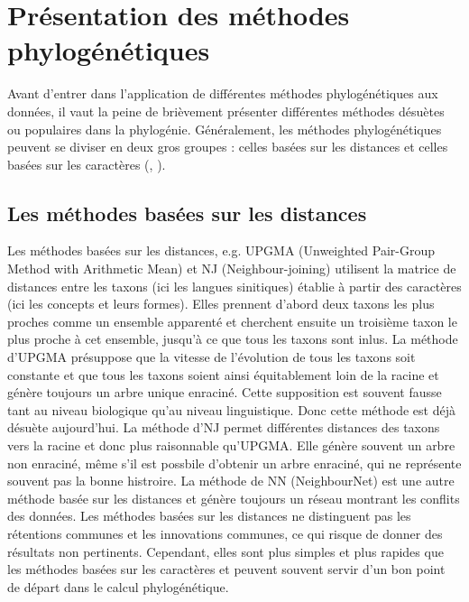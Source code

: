 \documentclass{scrbook}
\newcounter{c}[subsubsection]
\begin{document}
\begin{sloppypar}
\section{Présentation des méthodes phylogénétiques}
Avant d'entrer dans l'application de différentes méthodes phylogénétiques aux données, il vaut la peine de brièvement présenter différentes méthodes désuètes ou populaires dans la phylogénie. Généralement, les méthodes phylogénétiques peuvent se diviser en deux gros groupes : celles basées sur les distances et celles basées sur les caractères (\cite[74--75]{hall2018phylogenetic}, \cite[15--16]{pellardfamily}). 

\subsection{Les méthodes basées sur les distances}
Les méthodes basées sur les distances, e.g. UPGMA (Unweighted Pair-Group Method with Arithmetic Mean) et NJ (Neighbour-joining) utilisent la matrice de distances entre les taxons (ici les langues sinitiques) établie à partir des caractères (ici les concepts et leurs formes). Elles prennent d'abord deux taxons les plus proches comme un ensemble apparenté et cherchent ensuite un troisième taxon le plus proche à cet ensemble, jusqu'à ce que tous les taxons sont inlus. La méthode d'UPGMA présuppose que la vitesse de l'évolution de tous les taxons soit constante et que tous les taxons soient ainsi équitablement loin de la racine et génère toujours un arbre unique enraciné. Cette supposition est souvent fausse tant au niveau biologique qu'au niveau linguistique. Donc cette méthode est déjà désuète aujourd'hui. La méthode d'NJ permet différentes distances des taxons vers la racine et donc plus raisonnable qu'UPGMA. Elle génère souvent un arbre non enraciné, même s'il est possbile d'obtenir un arbre enraciné, qui ne représente souvent pas la bonne histroire. La méthode de NN (NeighbourNet) est une autre méthode basée sur les distances et génère toujours un réseau montrant les conflits des données. Les méthodes basées sur les distances ne distinguent pas les rétentions communes et les innovations communes, ce qui  risque de donner des résultats non pertinents. Cependant, elles sont plus simples et plus rapides que les méthodes basées sur les caractères et peuvent souvent servir d'un bon point de départ dans le calcul phylogénétique. 


\end{sloppypar}
\end{document}
